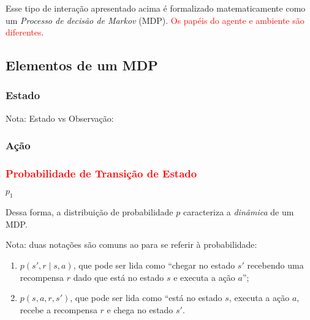 \documentclass{article}
\begin{document}
        Esse tipo de interação apresentado acima é formalizado matematicamente como um \emph{Processo de decisão de Markov} (MDP). \textcolor{red}{Os papéis do agente e ambiente são diferentes}.
    
        \subsection{Elementos de um MDP}
    
            \subsubsection{Estado}
            
                
                Nota: Estado vs Observação: 
                
            \subsubsection{Ação}
            
                
            \subsubsection{\textcolor{red}{Probabilidade de Transição de Estado}}
            
                $p_1$
            
                Dessa forma, a distribuição de probabilidade $p$ caracteriza a \emph{dinâmica} de um MDP.
            
                Nota: duas notações são comuns ao para se referir à probabilidade:
                
                \begin{enumerate}
                    \item $p(s', r \mid s, a)$, que pode ser lida como ``chegar no estado $s'$ recebendo uma recompensa $r$ dado que está no estado $s$ e executa a ação $a$'';
                    \item $p(s, a, r, s')$, que pode ser lida como ``está no estado $s$, executa a ação $a$, recebe a recompensa $r$ e chega no estado $s'$.
                \end{enumerate}
                
\end{document}
